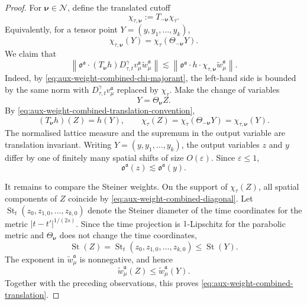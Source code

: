 \documentclass{article}
\numberwithin{equation}{section}
\newcommand{\assign}{:=}
\theoremstyle{plain}
\theoremstyle{definition}
\begin{document}
\begin{proof}
	For \(\boldsymbol\nu\in\mathcal N\), define the translated cutoff
	\begin{equation}
		\label{eq:aux-weight-combined-translated-cutoff}
		\chi_{\tau,\boldsymbol\nu}
		\assign
		T_{-\boldsymbol\nu}\chi_\tau.
	\end{equation}
	Equivalently, for a tensor point
	\(Y=(y,y_1,\ldots,y_k)\),
	\begin{equation}
		\label{eq:aux-weight-combined-translated-cutoff-pointwise}
		\chi_{\tau,\boldsymbol\nu}(Y)
		=
		\chi_\tau(\Theta_{-\boldsymbol\nu}Y).
	\end{equation}
	We claim that
	\begin{equation}
		\label{eq:aux-weight-combined-translation}
		\left\|
		\mathfrak o^{\mathfrak a}\cdot
		(T_{\boldsymbol\nu}h)
		D_{\tau,t}^{\gamma}v_\mu^{\mathfrak a}
		\tilde w_\mu^{\mathfrak a}
		\right\|
		\lesssim
		\left\|
		\mathfrak o^{\mathfrak a}\cdot h\cdot
		\chi_{\tau,\boldsymbol\nu}
		\tilde w_\mu^{\mathfrak a}
		\right\|.
	\end{equation}
	Indeed, by \eqref{eq:aux-weight-combined-chi-majorant}, the left-hand side
	is bounded by the same norm with
	\(D_{\tau,t}^{\gamma}v_\mu^{\mathfrak a}\) replaced by \(\chi_\tau\).
	Make the change of variables
	\[
		Y=\Theta_{\boldsymbol\nu}Z.
		\]
		By \eqref{eq:aux-weight-combined-translation-convention},
		\[
		(T_{\boldsymbol\nu}h)(Z)=h(Y),
		\qquad
		\chi_\tau(Z)
		=
		\chi_\tau(\Theta_{-\boldsymbol\nu}Y)
		=
	\chi_{\tau,\boldsymbol\nu}(Y).
	\]
	The normalised lattice measure and the supremum in the output variable
	are translation invariant.  Writing
	\(Y=(y,y_1,\ldots,y_k)\), the output variables \(z\) and \(y\) differ by
	one of finitely many spatial shifts of size \(O(\varepsilon)\).  Since
	\(\varepsilon\leqslant1\),
	\[
	\mathfrak o^{\mathfrak a}(z)
	\lesssim
	\mathfrak o^{\mathfrak a}(y).
		\]
		
		It remains to compare the Steiner weights.  On the support of
		\(\chi_\tau(Z)\), all spatial components of \(Z\) coincide by
		\eqref{eq:aux-weight-combined-diagonal}.  Let
	\(\operatorname{St}_t(z_0,z_{1,0},\ldots,z_{k,0})\) denote the Steiner
	diameter of the time coordinates for the metric
	\(|t-t'|^{1/(2s)}\).  Since the time projection is \(1\)-Lipschitz for
	the parabolic metric and \(\Theta_{\boldsymbol\nu}\) does not change the
	time coordinates,
	\[
		\operatorname{St}(Z)
		=
		\operatorname{St}_t(z_0,z_{1,0},\ldots,z_{k,0})
		\leqslant
	\operatorname{St}(Y).
	\]
	The exponent in \(\tilde w_\mu^{\mathfrak a}\) is nonnegative, and hence
	\[
		\tilde w_\mu^{\mathfrak a}(Z)
		\leqslant
		\tilde w_\mu^{\mathfrak a}(Y).
	\]
	Together with the preceding observations, this proves
	\eqref{eq:aux-weight-combined-translation}.
	

\end{proof}
\end{document}

